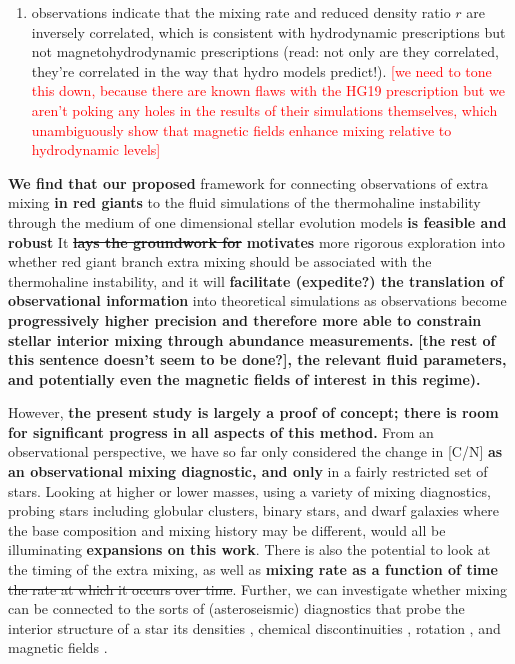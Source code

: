 \begin{enumerate}
    \item observations indicate that the mixing rate and reduced density ratio $r$ are inversely correlated, which is consistent with hydrodynamic prescriptions but not  magnetohydrodynamic prescriptions (read: not only are they correlated, they're correlated in the way that hydro models predict!). \textcolor{red}{[we need to tone this down, because there are known flaws with the HG19 prescription but we aren't poking any holes in the results of their simulations themselves, which unambiguously show that magnetic fields enhance mixing relative to hydrodynamic levels]}
    
    \end{enumerate}

\textbf{We find that our proposed} framework for connecting observations of extra mixing \textbf{in red giants} to the fluid simulations of the thermohaline instability through the medium of one dimensional stellar evolution models \textbf{is feasible and robust}
%
It \sout{\textbf{lays the groundwork for}} \textbf{motivates}
more rigorous exploration into whether red giant branch extra mixing should be associated with the thermohaline instability, and 
it will \textbf{facilitate (expedite?) the translation of observational information}
into theoretical simulations as observations become \textbf{progressively higher precision and therefore more able to constrain stellar interior mixing through abundance measurements.}
\textbf{[the rest of this sentence doesn't seem to be done?], the relevant fluid parameters, and potentially even the magnetic fields of interest in this regime).}

However, \textbf{the present study is largely a proof of concept;
there is room for significant progress in
all aspects of this method.} From an observational perspective, we have so far only considered the change in [C/N] \textbf{as an observational mixing diagnostic, and only} in a fairly restricted set of stars. Looking at higher or lower masses, using a variety of mixing diagnostics, probing stars including globular clusters, binary stars, and dwarf galaxies where the base composition and mixing history may be different, would all be illuminating \textbf{expansions on this work}. There is also the potential to look at the timing of the extra mixing, as well as \textbf{mixing rate as a function of time} \sout{the rate at which it occurs over time}. Further, we can investigate  whether mixing can be connected to the sorts of (asteroseismic) diagnostics that probe the interior structure of a star its densities \citep{KjeldsenBedding1995}, chemical discontinuities \citep{Verma2017}, rotation \citep{Gehan2018}, and magnetic fields \citep{Bugnet2021}. 

